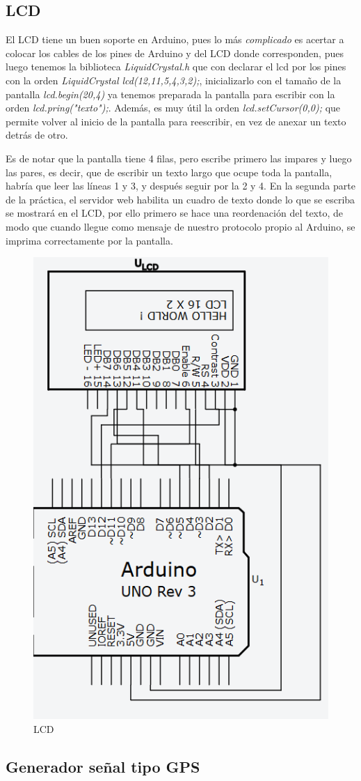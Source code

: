 \documentclass[]{article}
\begin{document}
\subsection{LCD}

El LCD tiene un buen soporte en Arduino, pues lo más \textit{complicado} es acertar a colocar los cables de los pines de Arduino y del LCD donde corresponden, pues luego tenemos la biblioteca \textit{LiquidCrystal.h} que con declarar el lcd por los pines con la orden \textit{LiquidCrystal lcd(12,11,5,4,3,2);}, inicializarlo con el tamaño de la pantalla \textit{lcd.begin(20,4)} ya tenemos preparada la pantalla para escribir con la orden \textit{lcd.pring("texto");}. Además, es muy útil la orden \textit{lcd.setCursor(0,0);} que permite volver al inicio de la pantalla para reescribir, en vez de anexar un texto detrás de otro.

Es de notar que la pantalla tiene 4 filas, pero escribe primero las impares y luego las pares, es decir, que de escribir un texto largo que ocupe toda la pantalla, habría que leer las líneas 1 y 3, y después seguir por la 2 y 4. En la segunda parte de la práctica, el servidor web habilita un cuadro de texto donde lo que se escriba se mostrará en el LCD, por ello primero se hace una reordenación del texto, de modo que cuando llegue como mensaje de nuestro protocolo propio al Arduino, se imprima correctamente por la pantalla.

\begin{figure}[H]
	\centering
	\includegraphics[width=0.4\linewidth]{images/lcd.PNG}
	\caption{LCD}
	\label{fig:lcd}
\end{figure}


\subsection{Generador señal tipo GPS}
\end{document}
